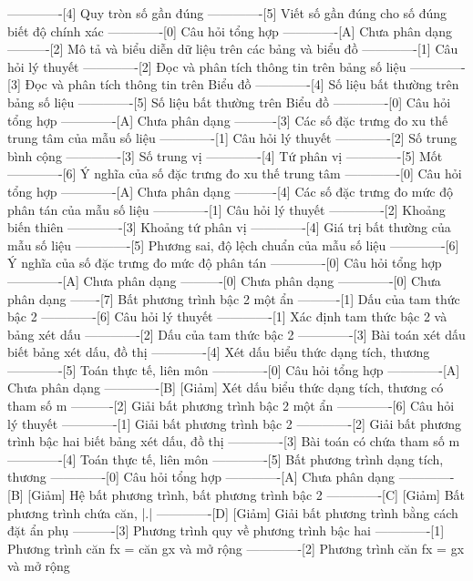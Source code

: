 -------------[4] Quy tròn số gần đúng
-------------[5] Viết số gần đúng cho số đúng biết độ chính xác
-------------[0] Câu hỏi tổng hợp
-------------[A] Chưa phân dạng
----------[2] Mô tả và biểu diễn dữ liệu trên các bảng và biểu đồ
-------------[1] Câu hỏi lý thuyết
-------------[2] Đọc và phân tích thông tin trên bảng số liệu
-------------[3] Đọc và phân tích thông tin trên Biểu đồ
-------------[4] Số liệu bất thường trên bảng số liệu
-------------[5] Số liệu bất thường trên Biểu đồ
-------------[0] Câu hỏi tổng hợp
-------------[A] Chưa phân dạng
----------[3] Các số đặc trưng đo xu thế trung tâm của mẫu số liệu
-------------[1] Câu hỏi lý thuyết
-------------[2] Số trung bình cộng
-------------[3] Số trung vị
-------------[4] Tứ phân vị
-------------[5] Mốt
-------------[6] Ý nghĩa của số đặc trưng đo xu thế trung tâm
-------------[0] Câu hỏi tổng hợp
-------------[A] Chưa phân dạng
----------[4] Các số đặc trưng đo mức độ phân tán của mẫu số liệu
-------------[1] Câu hỏi lý thuyết
-------------[2] Khoảng biến thiên
-------------[3] Khoảng tứ phân vị
-------------[4] Giá trị bất thường của mẫu số liệu
-------------[5] Phương sai, độ lệch chuẩn của mẫu số liệu
-------------[6] Ý nghĩa của số đặc trưng đo mức độ phân tán
-------------[0] Câu hỏi tổng hợp
-------------[A] Chưa phân dạng
----------[0] Chưa phân dạng
-------------[0] Chưa phân dạng
-------[7] Bất phương trình bậc 2 một ẩn
----------[1] Dấu của tam thức bậc 2
-------------[6] Câu hỏi lý thuyết
-------------[1] Xác định tam thức bậc 2 và bảng xét dấu
-------------[2] Dấu của tam thức bậc 2
-------------[3] Bài toán xét dấu biết bảng xét dấu, đồ thị
-------------[4] Xét dấu biểu thức dạng tích, thương
-------------[5] Toán thực tế, liên môn
-------------[0] Câu hỏi tổng hợp
-------------[A] Chưa phân dạng
-------------[B] [Giảm] Xét dấu biểu thức dạng tích, thương có tham số m
----------[2] Giải bất phương trình bậc 2 một ẩn
-------------[6] Câu hỏi lý thuyết
-------------[1] Giải bất phương trình bậc 2
-------------[2] Giải bất phương trình bậc hai biết bảng xét dấu, đồ thị
-------------[3] Bài toán có chứa tham số m
-------------[4] Toán thực tế, liên môn
-------------[5] Bất phương trình dạng tích, thương
-------------[0] Câu hỏi tổng hợp
-------------[A] Chưa phân dạng
-------------[B] [Giảm] Hệ bất phương trình, bất phương trình bậc 2
-------------[C] [Giảm] Bất phương trình chứa căn, |.|
-------------[D] [Giảm] Giải bất phương trình bằng cách đặt ẩn phụ
----------[3] Phương trình quy về phương trình bậc hai
-------------[1] Phương trình căn fx = căn gx và mở rộng
-------------[2] Phương trình căn fx = gx và mở rộng
